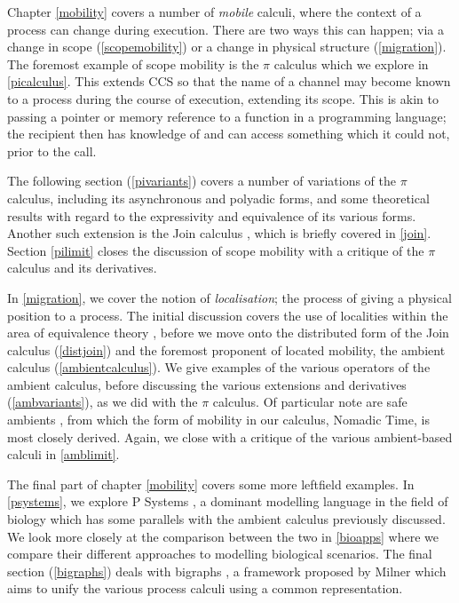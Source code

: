Chapter \ref{mobility} covers a number of \emph{mobile} calculi, where
the context of a process can change during execution.  There are two
ways this can happen; via a change in scope (\ref{scopemobility}) or a
change in physical structure (\ref{migration}).  The foremost example
of scope mobility is the $\pi$ calculus \cite{milner:pi} which we
explore in \ref{picalculus}.  This extends CCS so that the name of a
channel may become known to a process during the course of execution,
extending its scope.  This is akin to passing a pointer or memory
reference to a function in a programming language; the recipient then
has knowledge of and can access something which it could not, prior to
the call.

The following section (\ref{pivariants}) covers a number of variations
of the $\pi$ calculus, including its asynchronous and polyadic forms,
and some theoretical results with regard to the expressivity and
equivalence of its various forms.  Another such extension is the Join
calculus \cite{join}, which is briefly covered in \ref{join}.  Section
\ref{pilimit} closes the discussion of scope mobility with a critique
of the $\pi$ calculus and its derivatives.

In \ref{migration}, we cover the notion of \emph{localisation}; the
process of giving a physical position to a process.  The initial
discussion covers the use of localities within the area of equivalence
theory \cite{obslocal}, before we move onto the distributed form of
the Join calculus \cite{djoin} (\ref{distjoin}) and the foremost
proponent of located mobility, the ambient calculus \cite{amb}
(\ref{ambientcalculus}).  We give examples of the various operators of
the ambient calculus, before discussing the various extensions and
derivatives (\ref{ambvariants}), as we did with the $\pi$ calculus.
Of particular note are safe ambients \cite{sangiorgi:mobsafeambients},
from which the form of mobility in our calculus, Nomadic Time, is most
closely derived.  Again, we close with a critique of the various
ambient-based calculi in \ref{amblimit}.

The final part of chapter \ref{mobility} covers some more leftfield
examples.  In \ref{psystems}, we explore P Systems
\cite{membranecomp}, a dominant modelling language in the field of
biology which has some parallels with the ambient calculus previously
discussed.  We look more closely at the comparison between the two in
\ref{bioapps} where we compare their different approaches to modelling
biological scenarios.  The final section (\ref{bigraphs}) deals with
bigraphs \cite{bigraph1}, a framework proposed by Milner which aims to
unify the various process calculi using a common representation.

